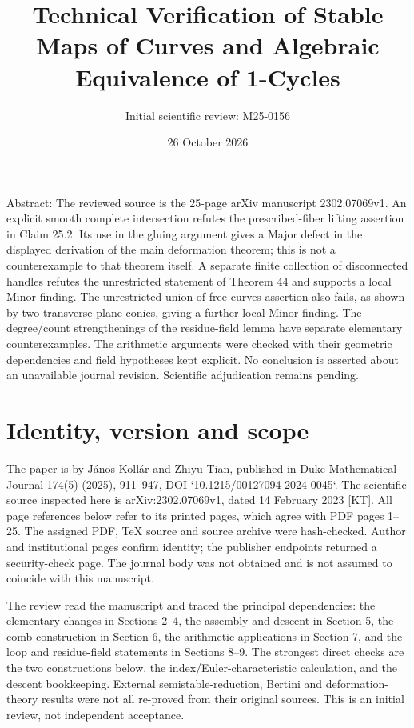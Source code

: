 \documentclass[10pt]{article}
\title{Technical Verification of
Stable Maps of Curves and Algebraic Equivalence of 1-Cycles}
\author{Initial scientific review: M25-0156}
\date{26 October 2026}
\begin{document}
\maketitle
Abstract: The reviewed source is the 25-page arXiv manuscript 2302.07069v1. An explicit smooth complete intersection refutes the prescribed-fiber lifting assertion in Claim 25.2. Its use in the gluing argument gives a Major defect in the displayed derivation of the main deformation theorem; this is not a counterexample to that theorem itself. A separate finite collection of disconnected handles refutes the unrestricted statement of Theorem 44 and supports a local Minor finding. The unrestricted union-of-free-curves assertion also fails, as shown by two transverse plane conics, giving a further local Minor finding. The degree/count strengthenings of the residue-field lemma have separate elementary counterexamples. The arithmetic arguments were checked with their geometric dependencies and field hypotheses kept explicit. No conclusion is asserted about an unavailable journal revision. Scientific adjudication remains pending.\par
\section*{Identity, version and scope}
The paper is by János Kollár and Zhiyu Tian, published in Duke Mathematical Journal 174(5) (2025), 911–947, DOI `10.1215/00127094-2024-0045`. The scientific source inspected here is arXiv:2302.07069v1, dated 14 February 2023 [KT]. All page references below refer to its printed pages, which agree with PDF pages 1–25. The assigned PDF, TeX source and source archive were hash-checked. Author and institutional pages confirm identity; the publisher endpoints returned a security-check page. The journal body was not obtained and is not assumed to coincide with this manuscript.\par
The review read the manuscript and traced the principal dependencies: the elementary changes in Sections 2–4, the assembly and descent in Section 5, the comb construction in Section 6, the arithmetic applications in Section 7, and the loop and residue-field statements in Sections 8–9. The strongest direct checks are the two constructions below, the index/Euler-characteristic calculation, and the descent bookkeeping. External semistable-reduction, Bertini and deformation-theory results were not all re-proved from their original sources. This is an initial review, not independent acceptance.\par
\end{document}
